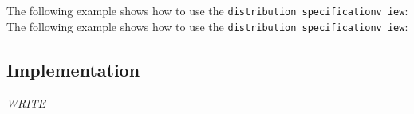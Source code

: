 The following example shows how to use the \texttt{distribution specificationv iew}:
The following example shows how to use the \texttt{distribution specificationv iew}:


\subsection{Implementation} \label{sec-dist-spec-vw-impl}

\textit{WRITE}

